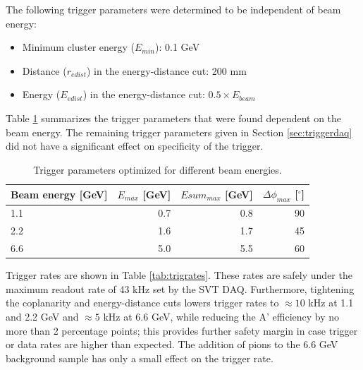 The following trigger parameters were determined to be independent of beam energy:
\begin{itemize}
	\item Minimum cluster energy ($E_{min}$): 0.1 GeV
	\item Distance ($r_{edist}$) in the energy-distance cut: 200 mm
	\item Energy ($E_{edist}$) in the energy-distance cut: $0.5\times E_{beam}$
\end{itemize}

Table \ref{tab:trigcuts} summarizes the trigger parameters that were found dependent on the beam energy. 
The remaining trigger parameters given in Section \ref{sec:triggerdaq} did not have a significant 
effect on specificity of the trigger.

\begin{table}
	\begin{tabular}{|l|r|r|r|}
		\hline
		Beam energy [GeV] & $E_{max}$ [GeV] & $Esum_{max}$ [GeV] & $\Delta\phi_{max}$ [$^\circ$] \\
		\hline
		1.1	&	0.7	&	0.8	&	90\\
		2.2	&	1.6	&	1.7	&	45\\
		6.6	&	5.0	&	5.5	&	60\\
		\hline
	\end{tabular}
	\caption{ {\small Trigger parameters optimized for different beam energies.}
	\label{tab:trigcuts}}
\end{table}

Trigger rates are shown in Table \ref{tab:trigrates}. These rates are safely under the maximum readout rate of 43 kHz set by the SVT DAQ. 
Furthermore, tightening the coplanarity and energy-distance cuts lowers trigger rates to $\approx 10$ kHz at 1.1 and 2.2 GeV and $\approx 5$ kHz at 6.6 GeV, while reducing the A' efficiency by no more than 2 percentage points; this provides further safety margin in case trigger or data rates are higher than expected.
The addition of pions to the 6.6 GeV background sample has only a small effect on the trigger rate.

